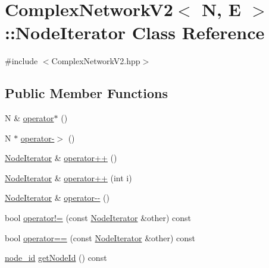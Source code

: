 \hypertarget{class_complex_network_v2_1_1_node_iterator}{\section{Complex\+Network\+V2$<$ N, E $>$\+:\+:Node\+Iterator Class Reference}
\label{class_complex_network_v2_1_1_node_iterator}
}


{\ttfamily \#include $<$Complex\+Network\+V2.\+hpp$>$}

\subsection*{Public Member Functions}
\begin{DoxyCompactItemize}
\item 
N \& \hyperlink{class_complex_network_v2_1_1_node_iterator_a44d9128cc9ed0835109f8f9456b895ab}{operator$\ast$} ()
\item 
N $\ast$ \hyperlink{class_complex_network_v2_1_1_node_iterator_a3a7857235e94c7e66fcab20ad384626c}{operator-\/$>$} ()
\item 
\hyperlink{class_complex_network_v2_1_1_node_iterator}{Node\+Iterator} \& \hyperlink{class_complex_network_v2_1_1_node_iterator_a0b4fde5b22517de5938386fe14158615}{operator++} ()
\item 
\hyperlink{class_complex_network_v2_1_1_node_iterator}{Node\+Iterator} \& \hyperlink{class_complex_network_v2_1_1_node_iterator_a623b66e0065252e00ccd3039f8a3bd0c}{operator++} (int i)
\item 
\hyperlink{class_complex_network_v2_1_1_node_iterator}{Node\+Iterator} \& \hyperlink{class_complex_network_v2_1_1_node_iterator_a152a2bde89af86f13578037d94776cb8}{operator-\/-\/} ()
\item 
bool \hyperlink{class_complex_network_v2_1_1_node_iterator_a0570890a12ef213c474492c8444d3bf1}{operator!=} (const \hyperlink{class_complex_network_v2_1_1_node_iterator}{Node\+Iterator} \&other) const 
\item 
bool \hyperlink{class_complex_network_v2_1_1_node_iterator_a579b10eeff35231dcc96eb22373c7b85}{operator==} (const \hyperlink{class_complex_network_v2_1_1_node_iterator}{Node\+Iterator} \&other) const 
\item 
\hyperlink{_complex_network_8hpp_a8323334ca788fde39682469321590d52}{node\+\_\+id} \hyperlink{class_complex_network_v2_1_1_node_iterator_a4863bcbe83fc0cb28eb6159bd1326c47}{get\+Node\+Id} () const 
\end{DoxyCompactItemize}
